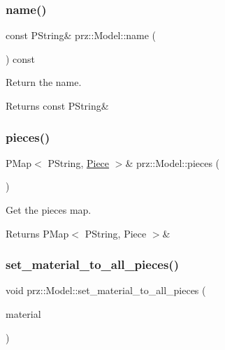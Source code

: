 \subsubsection{\texorpdfstring{name()}{name()}}
{\footnotesize\ttfamily const P\+String\& prz\+::\+Model\+::name (\begin{DoxyParamCaption}{ }\end{DoxyParamCaption}) const\hspace{0.3cm}{\ttfamily [inline]}}



Return the name. 

\begin{DoxyReturn}{Returns}
const P\+String\& 
\end{DoxyReturn}
\mbox{\label{classprz_1_1_model_ace7ab981e121cb00ded294060131aaf1}} 
\subsubsection{\texorpdfstring{pieces()}{pieces()}}
{\footnotesize\ttfamily P\+Map$<$ P\+String, \mbox{\hyperlink{structprz_1_1_model_1_1_piece}{Piece}} $>$\& prz\+::\+Model\+::pieces (\begin{DoxyParamCaption}{ }\end{DoxyParamCaption})\hspace{0.3cm}{\ttfamily [inline]}}



Get the pieces map. 

\begin{DoxyReturn}{Returns}
P\+Map$<$ P\+String, Piece $>$\& 
\end{DoxyReturn}
\mbox{\label{classprz_1_1_model_aceccc8a7ed45ff2b0328f2bd68552aa6}} 
\subsubsection{\texorpdfstring{set\_material\_to\_all\_pieces()}{set\_material\_to\_all\_pieces()}}
{\footnotesize\ttfamily void prz\+::\+Model\+::set\+\_\+material\+\_\+to\+\_\+all\+\_\+pieces (\begin{DoxyParamCaption}\item[{P\+S\+Ptr$<$ \mbox{\hyperlink{classprz_1_1_material}{Material}} $>$}]{material }\end{DoxyParamCaption})\hspace{0.3cm}{\ttfamily [inline]}}



